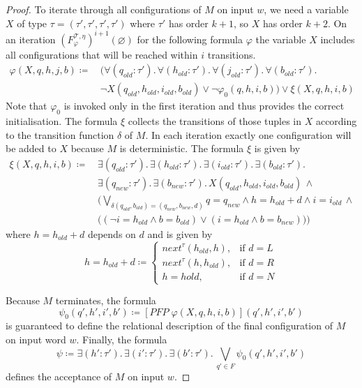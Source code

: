 \begin{proof}
    To iterate through all configurations of $M$ on input $w$, we need a variable $X$ of type $\tau =
    (\tau', \tau', \tau', \tau')$ where $\tau'$ has order $k + 1$, so $X$ has order $k + 2$. On an iteration
    $(F_\varphi^{\mathcal{T},\eta})^{i+1}(\varnothing)$ for the following formula $\varphi$ the variable $X$ includes
    all configurations that will be reached within $i$ transitions.
    \begin{align*}
        \varphi(X, q, h, j, b) \coloneqq &\,(\forall (q_{old} \colon \tau').\, \forall
        (h_{old}
        \colon \tau').\, \forall (j_{old} \colon \tau').\, \forall (b_{old} \colon \tau').\,\\
        &\, \neg X(q_{old}, h_{old}, i_{old}, b_{old}) \vee \neg \varphi_0(q, h, i, b)) \vee \xi(X, q, h, i, b)
    \end{align*}
    Note that $\varphi_0$ is invoked only in the first iteration and thus provides the correct initialisation. The
    formula $\xi$ collects the transitions of those tuples in $X$ according to the transition function $\delta$ of
    $M$. In each iteration exactly one configuration will be added to $X$ because $M$ is deterministic.
    The formula $\xi$ is given by
    \begin{align*}
        \xi(X, q, h, i, b) \coloneqq &\,\exists (q_{old} \colon \tau').\, \exists (h_{old} \colon
        \tau').\, \exists (i_{old} \colon \tau').\, \exists (b_{old} \colon \tau').\, \\
        &\,\exists (q_{new} \colon \tau').\, \exists (b_{new} \colon \tau').\,X(q_{old}, h_{old}, i_{old},
        b_{old}) \,\wedge \\
        &\, \Big(\underset{\delta(q_{old}, b_{old}) = (q_{new}, b_{new}, d)}{\bigvee} q = q_{new} \wedge h =
        h_{old} + d \wedge i = i_{old}\,\wedge\\&\, \big((\neg i = h_{old} \wedge b =
        b_{old}) \vee (i = h_{old} \wedge b = b_{new})\big)\Big)
    \end{align*}
    where $h = h_{old} + d$ depends on $d$ and is given by
    \[h = h_{old} + d \coloneqq
    \begin{cases}
        next^\tau(h_{old}, h),  & \text{if } d = L\\
        next^\tau(h, h_{old}),  & \text{if } d = R\\
        h = h{old},  & \text{if } d = N
    \end{cases}\]

    Because $M$ terminates, the formula
    \[\psi_0(q', h', i', b') \coloneqq [\mathit{PFP}\;\varphi(X, q, h, i, b)](q', h', i', b') \]
    is guaranteed to define the relational description of the final configuration of $M$ on input word $w$.
    Finally, the formula
    \[\psi \coloneqq \exists (h' \colon \tau').\, \exists (i' \colon \tau').\, \exists (b' \colon \tau').\,
    \underset{q' \in F}{\bigvee} \psi_0(q', h', i', b')\]
    defines the acceptance of $M$ on input $w$.
\end{proof}


